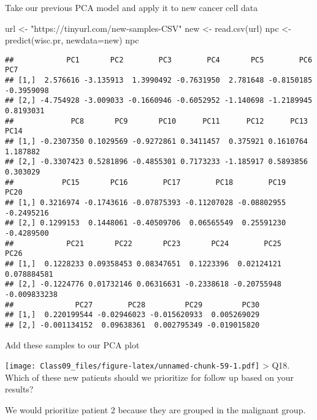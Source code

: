 \documentclass[
]{article}
\newenvironment{Shaded}{\begin{snugshade}}{\end{snugshade}}
\newcommand{\AttributeTok}[1]{\textcolor[rgb]{0.77,0.63,0.00}{#1}}
\newcommand{\DecValTok}[1]{\textcolor[rgb]{0.00,0.00,0.81}{#1}}
\newcommand{\FunctionTok}[1]{\textcolor[rgb]{0.00,0.00,0.00}{#1}}
\newcommand{\NormalTok}[1]{#1}
\newcommand{\OtherTok}[1]{\textcolor[rgb]{0.56,0.35,0.01}{#1}}
\newcommand{\SpecialCharTok}[1]{\textcolor[rgb]{0.00,0.00,0.00}{#1}}
\newcommand{\StringTok}[1]{\textcolor[rgb]{0.31,0.60,0.02}{#1}}
\begin{document}
Take our previous PCA model and apply it to new cancer cell data

\begin{Shaded}
\begin{Highlighting}[]
\NormalTok{url }\OtherTok{\textless{}{-}} \StringTok{"https://tinyurl.com/new{-}samples{-}CSV"}
\NormalTok{new }\OtherTok{\textless{}{-}} \FunctionTok{read.csv}\NormalTok{(url)}
\NormalTok{npc }\OtherTok{\textless{}{-}} \FunctionTok{predict}\NormalTok{(wisc.pr, }\AttributeTok{newdata=}\NormalTok{new)}
\NormalTok{npc}
\end{Highlighting}
\end{Shaded}

\begin{verbatim}
##            PC1       PC2        PC3        PC4       PC5        PC6        PC7
## [1,]  2.576616 -3.135913  1.3990492 -0.7631950  2.781648 -0.8150185 -0.3959098
## [2,] -4.754928 -3.009033 -0.1660946 -0.6052952 -1.140698 -1.2189945  0.8193031
##             PC8       PC9       PC10      PC11      PC12      PC13     PC14
## [1,] -0.2307350 0.1029569 -0.9272861 0.3411457  0.375921 0.1610764 1.187882
## [2,] -0.3307423 0.5281896 -0.4855301 0.7173233 -1.185917 0.5893856 0.303029
##           PC15       PC16        PC17        PC18        PC19       PC20
## [1,] 0.3216974 -0.1743616 -0.07875393 -0.11207028 -0.08802955 -0.2495216
## [2,] 0.1299153  0.1448061 -0.40509706  0.06565549  0.25591230 -0.4289500
##            PC21       PC22       PC23       PC24        PC25         PC26
## [1,]  0.1228233 0.09358453 0.08347651  0.1223396  0.02124121  0.078884581
## [2,] -0.1224776 0.01732146 0.06316631 -0.2338618 -0.20755948 -0.009833238
##              PC27        PC28         PC29         PC30
## [1,]  0.220199544 -0.02946023 -0.015620933  0.005269029
## [2,] -0.001134152  0.09638361  0.002795349 -0.019015820
\end{verbatim}

Add these samples to our PCA plot

\begin{Shaded}
\end{Shaded}

\texttt{[image: Class09\_files/figure-latex/unnamed-chunk-59-1.pdf]}
\textgreater{} Q18. Which of these new patients should we prioritize for
follow up based on your results?

We would prioritize patient 2 because they are grouped in the malignant
group.
\end{document}

